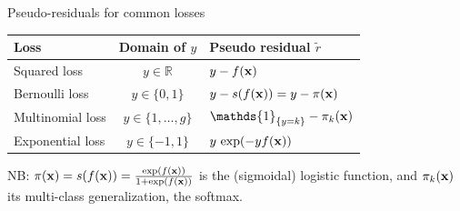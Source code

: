 \documentclass[11pt,compress,t,notes=noshow, xcolor=table]{beamer}
\begin{document}
\begin{vbframe}{Pseudo-residuals for common losses}

\lz
\lz

\begin{table}[ht]
\centering
\begin{tabular}{|l|c|l|}
\hline
\textbf{Loss} & \textbf{Domain of $y$} & \textbf{Pseudo residual $\tilde r$} \\ \hline
Squared loss & $y \in \mathbb{R}$ & $y - f(\mathbf{x})$ \\ \hline
Bernoulli loss & $y \in \{0,1\}$ & $y - s(f(\mathbf{x}))=y-\pi(\mathbf{x})$ \\ \hline
Multinomial loss & $y \in \{1,\dots,g\}$ & $\mathds{1}_{\{y=k\}} - \pi_k(\xv)$ \\ \hline
Exponential loss & $y \in \{-1,1\}$ & $y\,\exp(-yf(\mathbf{x}))$ \\ \hline
\end{tabular}
\end{table}

\lz

NB: $\pi(\mathbf{x})=s(f(\mathbf{x}))=\frac{\exp(f(\mathbf{x}))}{1+\exp(f(\mathbf{x}))}$ is the (sigmoidal) logistic function,
and $\pi_k(\mathbf{x})$ its multi-class generalization, the softmax.

\end{vbframe}



\endlecture
\end{document}
